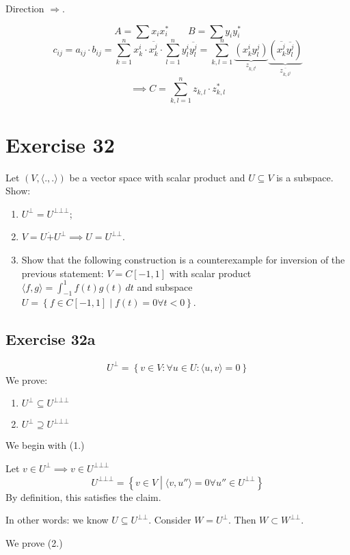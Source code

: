 \documentclass[a4paper]{article}
\theoremstyle{definition}
\newcommand\set[1]{\left\{#1\right\}}
\newcommand\ip[2]{\langle{#1},{#2}\rangle}
\begin{document}
Direction $\Rightarrow$.

\[ A = \sum x_i x_i^* \qquad B = \sum y_i y_i^* \]
\[
  c_{ij} = a_{ij} \cdot b_{ij}
    = \sum_{k=1}^n x_k^i \cdot \overline{x_k^j} \cdot \sum_{l=1}^n y_l^i \overline{y_l^j}
    = \sum_{k,l=1}^n \underbrace{\left(x_k^i y_l^j\right)}_{z_{k,l^i}} \underbrace{\left(\overline{x_k^j} \overline{y_l^j}\right)}_{\overline{z_{k,l^j}}}
\]
\[
  \implies C = \sum_{k,l=1}^n z_{k,l} \cdot z_{k,l}^*
\]

\section{Exercise 32}
\begin{ex}
  Let $(V, \ip{.}{.})$ be a vector space with scalar product and $U \subseteq V$ is a subspace. Show:
  \begin{enumerate}
    \item $U^\bot = U^{\bot\bot\bot}$;
    \item $V = U \dot{+} U^{\bot} \implies U = U^{\bot\bot}$.
    \item Show that the following construction is a counterexample for inversion of the previous statement:
      $V = C[-1,1]$ with scalar product $\langle f,g\rangle = \int_{-1}^1 f(t) g(t) \, dt$
      and subspace $U = \set{f \in C[-1,1] \middle| f(t) = 0 \forall t < 0}$.
  \end{enumerate}
\end{ex}

\subsection{Exercise 32a}

\[ U^\bot = \set{v \in V: \forall u \in U: \ip uv = 0} \]
We prove:
\begin{enumerate}
  \item $U^\bot \subseteq U^{\bot\bot\bot}$
  \item $U^\bot \supseteq U^{\bot\bot\bot}$
\end{enumerate}

We begin with (1.)

Let $v \in U^\bot \implies v \in U^{\bot\bot\bot}$
\[ U^{\bot\bot\bot} = \set{v \in V \middle| \ip{v}{u''} = 0 \forall u'' \in U^{\bot\bot}} \]
By definition, this satisfies the claim.

In other words: we know $U \subseteq U^{\bot\bot}$. Consider $W = U^{\bot}$. Then $W \subset W^{\bot\bot}$.

We prove (2.)
\end{document}
